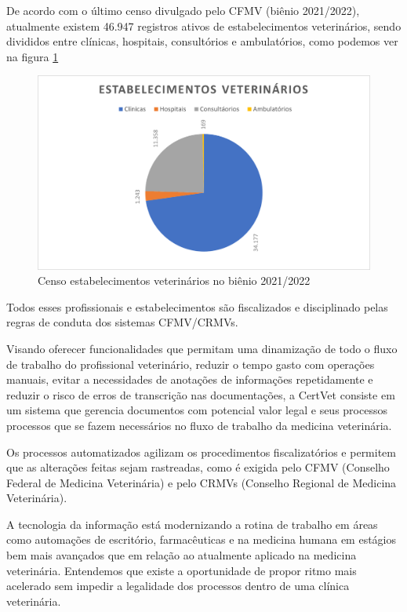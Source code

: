 \documentclass[
    12pt,               %
    openright,          %
    oneside,
    a4paper,            %
    BIBLATEX,           %
    TODO,               %
    english,            %
    brazil              %
    ]{ifsp-spo-inf-ctds}
\begin{document}
    De acordo com o último censo divulgado pelo CFMV (biênio 2021/2022), atualmente existem 46.947 registros ativos de estabelecimentos veterinários, sendo divididos entre clínicas, hospitais, consultórios e ambulatórios, como podemos ver na figura \ref{fig:grafico clinicas} \cite{clinicas2022}
    
    \begin{figure}[H]
        \centering
        \includegraphics{images/grafico_estabelecimento.png}
        \caption{Censo estabelecimentos veterinários no biênio 2021/2022\cite{clinicas2022}}
        \label{fig:grafico clinicas}
    \end{figure}
    
    Todos esses profissionais e estabelecimentos são fiscalizados e disciplinado pelas regras de conduta dos sistemas CFMV/CRMVs.
    
    Visando oferecer funcionalidades que permitam uma dinamização de todo o fluxo de trabalho do profissional veterinário, reduzir o tempo gasto com operações manuais, evitar a necessidades de anotações de informações repetidamente e reduzir o risco de erros de transcrição nas documentações, a CertVet consiste em um sistema que gerencia documentos com potencial valor legal e seus processos processos que se fazem necessários no fluxo de trabalho da medicina veterinária.
    
    Os processos automatizados agilizam os procedimentos fiscalizatórios e permitem que as alterações feitas sejam rastreadas, como é exigida pelo CFMV (Conselho Federal de Medicina Veterinária) e pelo CRMVs (Conselho Regional de Medicina Veterinária)\cite{teleMV}.
    
    A tecnologia da informação está modernizando a rotina de trabalho em áreas como automações de escritório, farmacêuticas e na medicina humana em estágios bem mais avançados que em relação ao atualmente aplicado na medicina veterinária. Entendemos que existe a oportunidade de propor ritmo mais acelerado sem impedir a legalidade dos processos dentro de uma clínica veterinária.
    
\end{document}
